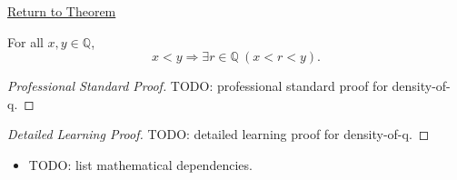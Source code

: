 \newpage
{}
\label{prf:density-of-q}

\begin{remark*}[Return]
\hyperref[thm:density-of-q]{Return to Theorem}
\end{remark*}

\begin{theorem*}
For all $x,y\in\mathbb{Q}$,
\[
x<y
\Longrightarrow
\exists r\in\mathbb{Q}\ (x<r<y).
\]
\end{theorem*}

\begin{proof}[Professional Standard Proof]
\LRAProofBodyStart
TODO: professional standard proof for density-of-q.
\end{proof}

\begin{proof}[Detailed Learning Proof]
\LRAProofBodyStart
TODO: detailed learning proof for density-of-q.
\end{proof}

\begin{remark*}
\end{remark*}

\begin{dependencies}
\begin{itemize}
  \item TODO: list mathematical dependencies.
\end{itemize}
\end{dependencies}

\clearpage
